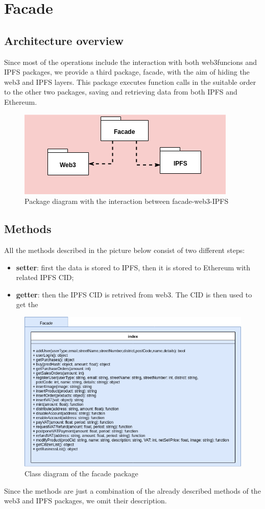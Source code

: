 \section{Facade} 

\subsection{Architecture overview}

Since most of the operations include the interaction with both web3funcions and IPFS packages, we provide a third package, facade, with the aim of hiding the web3 and IPFS layers. This package executes function calls in the suitable order to the other two packages, saving and retrieving data from both IPFS and Ethereum.

\begin{figure}[h]
	\centering
	\includegraphics[scale=0.6]{res/images/facade.png}
	\caption{Package diagram with the interaction between facade-web3-IPFS}
\end{figure}

\subsection{Methods}

All the methods described in the picture below consist of two different steps:
\begin{itemize}
	\item \textbf{setter}: first the data is stored to IPFS, then it is stored to Ethereum with related IPFS CID;
	\item \textbf{getter}: then the IPFS CID is retrived from web3. The CID is then used to get the 
\end{itemize}
\begin{figure}[H]
	\centering
	\includegraphics[scale=0.55]{res/images/facade-package.png}
	\caption{Class diagram of the facade package}
\end{figure}

\noindent Since the methods are just a combination of the already described methods of the web3 and IPFS packages, we omit their description.

